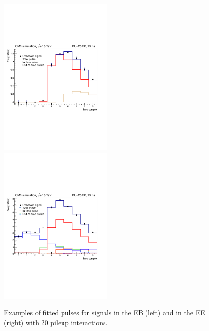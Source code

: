 \documentclass[thesis.tex]{subfiles}
\begin{document}
\begin{figure}[hbt]
	\includegraphics[width=0.5\textwidth]{plot/multifit_EB.pdf}
	\includegraphics[width=0.5\textwidth]{plot/multifit_EE.pdf}
	\caption{Examples of fitted pulses for signals in the EB (left) and in the EE (right) with 20 pileup interactions.}
	\label{fig:multifit}
\end{figure}
\end{document}
